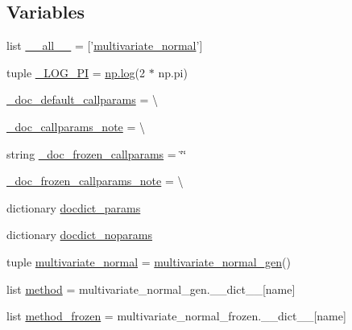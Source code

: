 \subsection*{Variables}
\begin{DoxyCompactItemize}
\item 
list \hyperlink{namespacescipy_1_1stats_1_1__multivariate_a554dd7c548d8dc17070a2f89bbafe323}{\+\_\+\+\_\+all\+\_\+\+\_\+} = \mbox{[}'\hyperlink{namespacescipy_1_1stats_1_1__multivariate_a60ba45824bae768ca43850150353602d}{multivariate\+\_\+normal}'\mbox{]}
\item 
tuple \hyperlink{namespacescipy_1_1stats_1_1__multivariate_a072e6cea7367af1cfca795987c2612b7}{\+\_\+\+L\+O\+G\+\_\+P\+I} = \hyperlink{vecuops_8cc_a9744da94c7846c49ff48444fde8d765f}{np.\+log}(2 $\ast$ np.\+pi)
\item 
\hyperlink{namespacescipy_1_1stats_1_1__multivariate_a4c0e333ba8ff80006e7b7d07c8956c62}{\+\_\+doc\+\_\+default\+\_\+callparams} = \textbackslash{}
\item 
\hyperlink{namespacescipy_1_1stats_1_1__multivariate_a7844534109b99865564a7e2bf0d054d5}{\+\_\+doc\+\_\+callparams\+\_\+note} = \textbackslash{}
\item 
string \hyperlink{namespacescipy_1_1stats_1_1__multivariate_a09a92fba0c2606a8b8f7ea9753bbb959}{\+\_\+doc\+\_\+frozen\+\_\+callparams} = \char`\"{}\char`\"{}
\item 
\hyperlink{namespacescipy_1_1stats_1_1__multivariate_ae025ef17f0c2839be5dd03c62ba546e7}{\+\_\+doc\+\_\+frozen\+\_\+callparams\+\_\+note} = \textbackslash{}
\item 
dictionary \hyperlink{namespacescipy_1_1stats_1_1__multivariate_a26942185172919c6d9d1b57a03f6bbcd}{docdict\+\_\+params}
\item 
dictionary \hyperlink{namespacescipy_1_1stats_1_1__multivariate_af30809f8bb166e014990565e39d68154}{docdict\+\_\+noparams}
\item 
tuple \hyperlink{namespacescipy_1_1stats_1_1__multivariate_a60ba45824bae768ca43850150353602d}{multivariate\+\_\+normal} = \hyperlink{classscipy_1_1stats_1_1__multivariate_1_1multivariate__normal__gen}{multivariate\+\_\+normal\+\_\+gen}()
\item 
list \hyperlink{namespacescipy_1_1stats_1_1__multivariate_aba344cec13175c0603e383f7176e695d}{method} = multivariate\+\_\+normal\+\_\+gen.\+\_\+\+\_\+dict\+\_\+\+\_\+\mbox{[}name\mbox{]}
\item 
list \hyperlink{namespacescipy_1_1stats_1_1__multivariate_a0960680809ec621835afefb2c3742e7f}{method\+\_\+frozen} = multivariate\+\_\+normal\+\_\+frozen.\+\_\+\+\_\+dict\+\_\+\+\_\+\mbox{[}name\mbox{]}
\end{DoxyCompactItemize}


